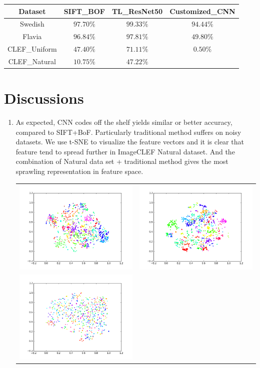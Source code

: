 \documentclass[journal, 10pt]{IEEEtran}
\begin{document}
\begin{tabular}{c@{}c@{}c@{}c@{}}
Dataset       & SIFT\_BOF & TL\_ResNet50  & Customized\_CNN \\
\hline
Swedish       & $97.70\%$ & $99.33\%$     & $94.44\%$ \\
Flavia        & $96.84\%$ & $97.81\%$     & $49.80\%$ \\
CLEF\_Uniform & $47.40\%$ & $71.11\%$     & $0.50\%$  \\
CLEF\_Natural & $10.75\%$ & $47.22\%$     &
\end{tabular}

\section{Discussions}
\begin{enumerate}
  \item As expected, CNN codes off the shelf yields similar or better accuracy, compared to SIFT+BoF. Particularly traditional method suffers on noisy datasets.  We use t-SNE \cite{tSNE} to visualize the feature vectors and it is clear that feature tend to spread further in ImageCLEF Natural dataset. And the combination of Natural data set + traditional method gives the most sprawling representation in feature space.
  \begin{tabular}{c@{}c@{}}
  {\includegraphics[width=0.50\linewidth]{tsne_uniform_bof}}  &
  {\includegraphics[width=0.50\linewidth]{tsne_uniform_tl}} \\
  {\includegraphics[width=0.50\linewidth]{tsne_natural_bof}}  &

\end{tabular}
\end{enumerate}
\end{document}
